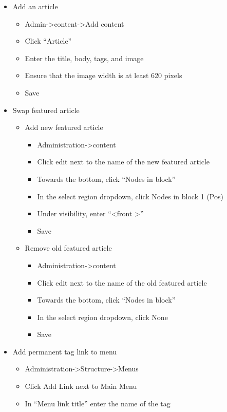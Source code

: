 \documentclass[10pt]{article} %
\begin{document}
\begin{itemize}
\itemindent 0pt
\item Add an article
	\begin{itemize}
	\itemindent 10pt
	\item Admin-\textgreater content-\textgreater Add content
	\item Click “Article”
	\item Enter the title, body, tags, and image
	\item Ensure that the image width is at least 620 pixels
	\item Save
	\end{itemize}
\item Swap featured article
	\begin{itemize}
	\itemindent 10pt
	\item Add new featured article
		\begin{itemize}
		\itemindent 20pt
		\item Administration-\textgreater content
		\item Click edit next to the name of the new featured article
		\item Towards the bottom, click “Nodes in block”
		\item In the select region dropdown, click Nodes in block 1 (Pos)
		\item Under visibility, enter “\textless front \textgreater”
		\item Save
		\end{itemize}
	\item Remove old featured article
		\begin{itemize}
		\itemindent 20pt
		\item Administration-\textgreater content
		\item Click edit next to the name of the old featured article
		\item Towards the bottom, click “Nodes in block”
		\item In the select region dropdown, click None
		\item Save
		\end{itemize}
	\end{itemize}
\item Add permanent tag link to menu
	\begin{itemize}
	\itemindent 10pt
	\item Administration-\textgreater Structure-\textgreater Menus
	\item Click Add Link next to Main Menu
	\item In “Menu link title” enter the name of the tag

\end{itemize}
\end{itemize}
\end{document}

